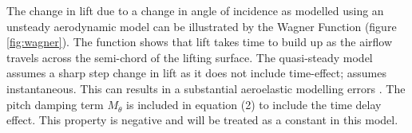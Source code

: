 \documentclass[11pt]{article}
\begin{document}
The change in lift due to a change in angle of incidence as modelled using an unsteady aerodynamic model can be illustrated by the Wagner Function (figure \ref{fig:wagner}). The function shows that lift takes time to build up as the  airflow travels across the semi-chord of the lifting surface. The quasi-steady model assumes a sharp step change in lift as it does not include time-effect; assumes instantaneous. This can results in a substantial aeroelastic modelling errors \cite{Wright2015INTRODUCTIONLOADS}. The pitch damping term $M_{\dot{\theta}}$ is included in equation (2) to include the time delay effect. This property is negative and will be treated as a constant in this model.\\ \\

\end{document}
